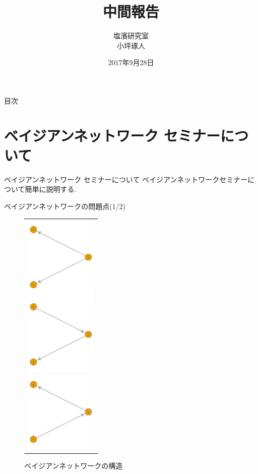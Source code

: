 \documentclass[dvipdfmx]{beamer}
\title[タイトル]{中間報告}
\author[発表者名]{塩濱研究室\\小坪琢人}
\institute[所属]{東京理科大学\ 工学部経営工学科4年\\学籍番号 4414036}
\date[日付]{2017年9月28日}
\begin{document}
\begin{frame}[plain]
\titlepage
\end{frame}
	
\begin{frame}{目次}
\tableofcontents
\end{frame}

\section{ベイジアンネットワーク セミナーについて}
\begin{frame}{ベイジアンネットワーク セミナーについて}
ベイジアンネットワークセミナーについて簡単に説明する.
\end{frame}

\begin{frame}{ベイジアンネットワークの問題点(1/2)}
\begin{figure}[H]
\begin{tabular}{c}
\begin{minipage}{0.33\hsize}
\begin{center}
\includegraphics[clip, width = 3.5cm]{data/BN1.png}
\end{center}
\end{minipage}
\begin{minipage}{0.33\hsize}
\begin{center}
\includegraphics[clip, width = 3.5cm]{data/BN2.png}
\end{center}
\end{minipage}
\begin{minipage}{0.33\hsize}
\begin{center}
\includegraphics[clip, width = 3.5cm]{data/BN3.png}
\end{center}
\end{minipage}
\end{tabular}
\vspace{-0.5zh}
\caption{ベイジアンネットワークの構造}
\label{fig:BN}
\end{figure}


\end{frame}
\end{document}
